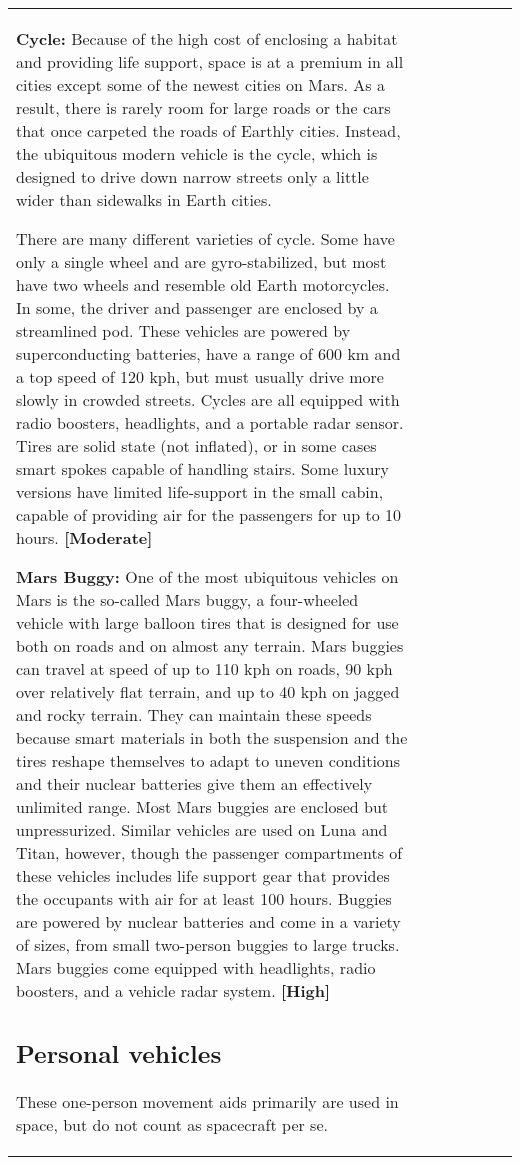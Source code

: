 \begin{tabular}{|l|l|l|l|l|l|l|}
\textbf{Cycle:} Because of the high cost of enclosing a habitat and providing life support, space is at a premium in all cities except some of the newest cities on Mars. As a result, there is rarely room for large roads or the cars that once carpeted the roads of Earthly cities. Instead, the ubiquitous modern vehicle is the cycle, which is designed to drive down narrow streets only a little wider than sidewalks in Earth cities. 

There are many different varieties of cycle. Some have only a single wheel and are gyro-stabilized, but most have two wheels and resemble old Earth motorcycles. In some, the driver and passenger are enclosed by a streamlined pod. These vehicles are powered by superconducting batteries, have a range of 600 km and a top speed of 120 kph, but must usually drive more slowly in crowded streets. Cycles are all equipped with radio boosters, headlights, and a portable radar sensor. Tires are solid state (not inflated), or in some cases smart spokes capable of handling stairs. Some luxury versions have limited life-support in the small cabin, capable of providing air for the passengers for up to 10 hours. \textbf{[Moderate]} 

\textbf{Mars Buggy:} One of the most ubiquitous vehicles on Mars is the so-called Mars buggy, a four-wheeled vehicle with large balloon tires that is designed for use both on roads and on almost any terrain. Mars buggies can travel at speed of up to 110 kph on roads, 90 kph over relatively flat terrain, and up to 40 kph on jagged and rocky terrain. They can maintain these speeds because smart materials in both the suspension and the tires reshape themselves to adapt to uneven conditions and their nuclear batteries give them an effectively unlimited range. Most Mars buggies are enclosed but unpressurized. Similar vehicles are used on Luna and Titan, however, though the passenger compartments of these vehicles includes life support gear that provides the occupants with air for at least 100 hours. Buggies are powered by nuclear batteries and come in a variety of sizes, from small two-person buggies to large trucks. Mars buggies come equipped with headlights, radio boosters, and a vehicle radar system. \textbf{[High]} 

\subsection{Personal vehicles} \label{sec:personal-vehicles} 

These one-person movement aids primarily are used in space, but do not count as spacecraft per se. 


\end{tabular}
